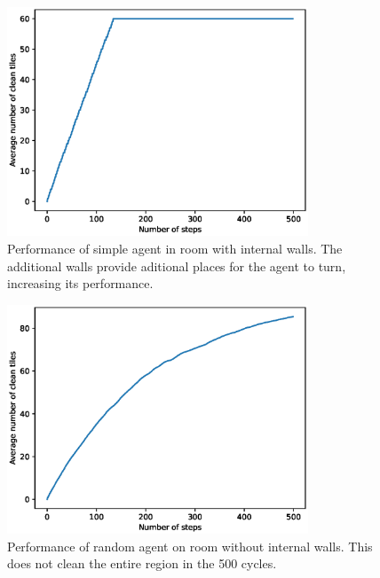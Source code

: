\documentclass{article}
\begin{document}
\begin{figure}[h!]
  \centering
  \includegraphics[width=0.8\textwidth]{SimpleExtraWallPerformance}
  \caption{Performance of simple agent in room with internal walls. The additional walls provide aditional places for the agent to turn, increasing its performance. }
  \label{fig:SimpleExtraWall}
\end{figure}
\begin{figure}[h!]
  \centering
  \includegraphics[width=0.8\textwidth]{RandomNoWallPerformance}
  \caption{Performance of random agent on room without internal walls. This does not clean the entire region in the 500 cycles.  }
  \label{fig:1}
\end{figure}
\end{document}
